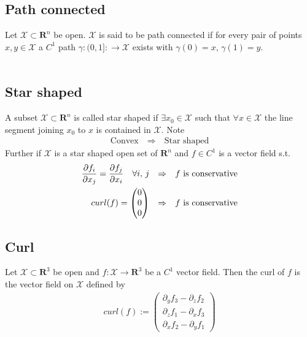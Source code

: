 \documentclass[8pt]{extarticle}
\newcommand{\R}{{\mathbb R}}
\newcommand{\X}{{\mathcal X}}
\newcommand{\ra}{{\rightarrow}}
\newcommand{\Ra}{{\Rightarrow}}
\def\R{\mathbf{R}}
\begin{document}
\begin{multicols*}{3}
  \subsection{Path connected}
  Let $\X \subset \R^n$ be open. $\X$ is said to be path
  connected if for every pair of points $x, y \in \X$ a $C^1$
  path $\gamma: (0, 1]: \ra \X$ exists with $\gamma(0) = x$, $\gamma(1) = y$.\\ \\
  \subsection{Star shaped}
  A subset $\X \subset \R^n$ is called star shaped if $\exists x_0 \in \X$
  such that $\forall x \in \X$ the line segment joining $x_0$ to $x$
  is contained in $\X$. Note
  \begin{align*}
    \text{Convex} \quad \Ra \quad \text{Star shaped}
  \end{align*}
  Further if $\X$ is a star shaped open set of $\R^n$ and $f \in C^1$
  is a vector field s.t.
  \begin{align*}
    \pdv{f_i}{x_j} = \pdv{f_j}{x_i} \quad \forall i,\, j
    \quad & \Ra \quad \text{$f$ is conservative} \\
    curl(f) = \begin{pmatrix}
      0 \\0\\0
    \end{pmatrix}
    \quad & \Ra \quad \text{$f$ is conservative} \\
  \end{align*}
  \subsection{Curl}
  Let $\X \subset \R^3$ be open and $f: \X \ra \R^3$ be a $C^1$ vector field.
  Then the curl of $f$ is the vector field on $\X$ defined by
  \begin{align*}
    curl(f) :=
    \begin{pmatrix}
      \partial_y f_3 - \partial_z f_2 \\
      \partial_z f_1 - \partial_x f_3 \\
      \partial_x f_2 - \partial_y f_1
    \end{pmatrix}
  \end{align*}

\end{multicols*}
\end{document}

